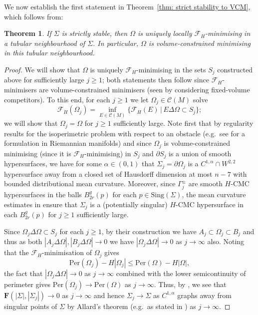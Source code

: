 \documentclass[12pt]{article}
\newtheorem{theorem}{Theorem}
\begin{document}
\medskip

We now establish the first statement in Theorem~\ref{thm: strict stability to VCM}, which follows from:


\begin{theorem}\label{thm: F_H strict stability to VCM} If $\Sigma$ is strictly stable, then $\Omega$ is uniquely locally $\mathcal{F}_H$-minimising in a tubular neighbourhood of $\Sigma$. In particular, $\Omega$ is volume-constrained minimising in this tubular neighbourhood.
\end{theorem} 


\begin{proof} 
    We will show that $\Omega$ is uniquely $\mathcal{F}_H$-minimising in the sets $S_j$ constructed above for sufficiently large $j \geq 1$; both statements then follow since $\mathcal{F}_H$-minimisers are volume-constrained minimisers (seen by considering fixed-volume competitors). To this end, for each $j \geq 1$ we let $\Omega_j \in \mathcal{C}(M)$ solve
    $$
        \mathcal{F}_H(\Omega_j) = \inf_{E \in \mathcal{C}(M)}\{\mathcal{F}_H(E) \, | \, E \Delta \Omega \subset S_j\};
    $$
    we will show that $\Omega_j = \Omega$ for $j \geq 1$ sufficiently large. Note first that by regularity results for the isoperimetric problem with respect to an obstacle (e.g.~see \cite[Theorem 1.1]{V10} for a formulation in Riemannian manifolds) and since $\Omega_j$ is volume-constrained minimising (since it is $\mathcal{F}_H$-minimising) in $S_j$ and $\partial S_j$ is a union of smooth hypersurfaces, we have for some $\alpha \in (0,1)$ that $\Sigma_j = \partial \Omega_j$ is a $C^{1,\alpha}\cap W^{2,2}$ hypersurface away from a closed set of Hausdorff dimension at most $n - 7$ with bounded distributional mean curvature. Moreover, since $\Gamma_j^{\pm}$ are smooth $H$-CMC hypersurfaces in the balls $B_{2r}^g(p)$ for each $p \in \mathrm{Sing}(\Sigma)$, the mean curvature estimates in \cite[Theorem 1.1]{V10} ensure that $\Sigma_j$ is a (potentially singular) $H$-CMC hypersurface in each $B_{2r}^g(p)$ for $j \geq 1$ sufficiently large.

    \bigskip

    Since $\Omega_j \Delta \Omega \subset S_j$ for each $j \geq 1$, by their construction we have $A_j \subset \Omega_j \subset B_j$ and thus as both $|A_j \Delta \Omega|, |B_j \Delta \Omega| \rightarrow 0$ we have $|\Omega_j \Delta \Omega| \rightarrow 0$ as $j \rightarrow \infty$ also. Noting that the $\mathcal{F}_H$-minimisation of $\Omega_j$ gives
    $$
            \mathrm{Per}(\Omega_j)-H|\Omega_j|
            \le
            \mathrm{Per}(\Omega)-H|\Omega|,
    $$
    the fact that $|\Omega_j \Delta \Omega| \rightarrow 0$ as $j \rightarrow \infty$ combined with the lower semicontinuity of perimeter gives $ \mathrm{Per}(\Omega_j)\rightarrow\mathrm{Per}(\Omega)$ as $j \rightarrow \infty$. Thus, by \cite[Proposition A.1]{DT13}, we see that $\mathbf{F}(|\Sigma|,|\Sigma_j|) \rightarrow 0$ as $j \rightarrow \infty$ and hence $\Sigma_j \rightarrow \Sigma$ as $C^{1,\alpha}$ graphs away from singular points of $\Sigma$ by Allard's theorem (e.g.~as stated in \cite[Chapter 5]{S83A}) as $j \rightarrow \infty$.


\end{proof}
\end{document}
